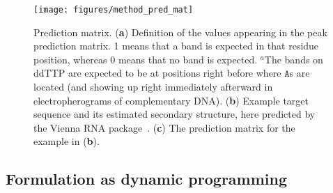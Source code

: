 \begin{enumerate}
\end{enumerate}




\begin{figure}
\centering
\texttt{[image: figures/method\_pred\_mat]}
\caption{Prediction matrix. (\textbf{a}) Definition of the values appearing in the peak prediction matrix. 1 means that a band is expected in that residue position, whereas 0 means that no band is expected. $^a$The bands on ddTTP are expected to be at positions right before where $\mathtt{A}$s are located (and showing up right immediately afterward in electropherograms of complementary DNA). (\textbf{b}) Example target sequence and its estimated secondary structure, here predicted by the Vienna RNA package~\citep{hofacker2003vienna}. (\textbf{c}) The prediction matrix for the example in (\textbf{b}).}
\label{f:pred-mat}
\end{figure}


\subsection{Formulation as dynamic programming}

